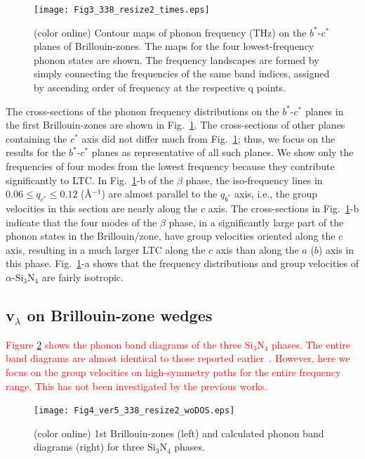 \documentclass[twocolumn,amsmath,amssymb,a4paper,prb,superscriptaddress,floatfix]{revtex4-1}
\begin{document}
\begin{figure}[ht]
 \begin{center}
  \texttt{[image: Fig3\_338\_resize2\_times.eps]} \caption{(color
  online) Contour maps of phonon frequency (THz) on the $b^*$-$c^*$
  planes of Brillouin-zones. The maps for the four lowest-frequency
  phonon states are shown. The frequency landscapes are formed by simply
  connecting the frequencies of the same band indices, assigned by
  ascending order of frequency at the respective q
  points. \label{fig:Fig3_338} }
 \end{center}
\end{figure}

The cross-sections of the phonon frequency distributions on the
$b^*$-$c^*$ planes in the first Brillouin-zones are shown in
Fig.~\ref{fig:Fig3_338}. The cross-sections of other planes containing
the $c^*$ axis did not differ much from Fig.~\ref{fig:Fig3_338}; thus,
we focus on the results for the $b^*$-$c^*$ planes as representative of
all such planes. We show only the frequencies of four modes from the
lowest frequency because they contribute significantly to LTC. In
Fig.~\ref{fig:Fig3_338}-b of the $\beta$ phase, the iso-frequency lines
in $0.06 \le q_{c^*} \le 0.12$ (\AA$^{-1}$) are almost parallel to the
$q_{b^*}$ axis, i.e., the group velocities in this section are nearly
along the $c$ axis. The cross-sections in Fig.~\ref{fig:Fig3_338}-b
indicate that the four modes of the $\beta$ phase, in a significantly
large part of the phonon states in the Brillouin/zone, have group
velocities oriented along the $c$ axis, resulting in a much larger LTC
along the $c$ axis than along the $a$ ($b$) axis in this
phase. Fig.~\ref{fig:Fig3_338}-a shows that the frequency distributions
and group velocities of $\alpha$-Si$_3$N$_4$ are fairly isotropic.

\subsection{v$_\lambda$ on Brillouin-zone wedges}


\textcolor{red}{Figure \ref{fig:Fig4_ver5_338} shows the phonon band diagrams 
of the three Si$_3$N$_4$ phases.
The entire band diagrams are almost identical to those reported earlier~\cite{kuwabara,xu}.
However, here we focus on the group velocities on high-symmetry paths for the 
entire frequency range. This has not been investigated by the previous works. 
}

\begin{figure}[ht]
 \begin{center}
  \texttt{[image: Fig4\_ver5\_338\_resize2\_woDOS.eps]}
  \caption{(color online) 1st Brillouin-zones (left) and calculated phonon band diagrams (right) for three Si$_3$N$_4$ phases.
  \label{fig:Fig4_ver5_338} }
 \end{center}
\end{figure}
\end{document}
